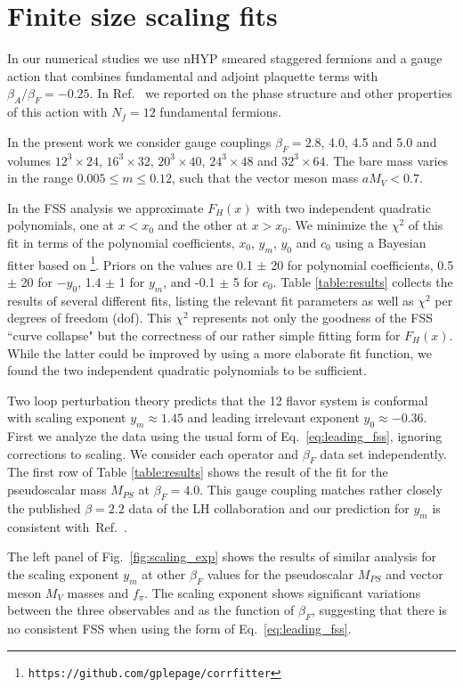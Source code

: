 \documentclass[aps,prl,twocolumn,]{revtex4-1}  %
\newcommand{\X}{\ensuremath{\!\times\!} }
\newcommand{\refcite}[1]{Ref.~\cite{#1}}
\newcommand{\eq}[1]{Eq.~\ref{#1}}
\newcommand{\fig}[1]{Fig.~\ref{#1}}
\begin{document}
\section{Finite size scaling fits}
In our numerical studies we use nHYP smeared staggered fermions and a  gauge action that combines fundamental and adjoint plaquette terms with $\beta_A/\beta_F=-0.25$.
In \refcite{Cheng:2011ic} we reported on the phase structure and other properties of this action with $N_f=12$ fundamental fermions.

In the present work we consider gauge couplings 
$\beta_F=2.8$, 4.0, 4.5 and 5.0  and volumes $12^3\X24$, 
$16^3\X32$, $20^3\X40$, $24^3\X48$ and $32^3\X64$. The bare mass varies in the range $0.005 \leq m \leq 0.12$, such that the vector meson mass $a M_V < 0.7$.


In the FSS analysis we approximate $F_H(x)$ with two independent quadratic polynomials, one at $x<x_0$ and the other at $x > x_0$. We minimize the $\chi^2$ of this fit in terms of the polynomial coefficients, $x_0$, $y_m$, $y_0$ and $c_0$ using a Bayesian fitter based on \cite{Lepage:2001ym,Hornbostel:2011hu}\footnote{\texttt{https://github.com/gplepage/corrfitter}}. Priors on the values are 0.1 $\pm$ 20 for polynomial coefficients, 0.5 $\pm$ 20 for $-y_0$, 1.4 $\pm$ 1 for $y_m$, and -0.1 $\pm$ 5 for $c_0$. Table \ref{table:results} collects the results of several different fits, listing the relevant fit parameters as well as  $\chi^2$ per degrees of freedom (dof). This  $\chi^2$ represents not only the goodness of the FSS ``curve collapse" but the correctness of our rather simple fitting form for $F_H(x)$.
While the latter  could be improved by using a more elaborate fit function, we found the two independent quadratic polynomials to be sufficient.

Two loop perturbation theory predicts that the 12 flavor system is conformal with scaling exponent $y_m \approx 1.45$ and leading irrelevant exponent $y_0 \approx -0.36$. First we analyze the data  using the usual form of \eq{eq:leading_fss}, ignoring corrections to scaling. We consider each operator and $\beta_F$ data set independently.  The first row of  Table \ref{table:results} shows the result of the fit for the pseudoscalar mass $M_{PS}$  at $\beta_F=4.0$. This gauge coupling matches rather closely the published $\beta=2.2$ data of the LH collaboration and our prediction for  $y_m$ is  consistent with~\refcite{Fodor:2011tu}. 

The left panel of \fig{fig:scaling_exp} shows the results of similar analysis for the scaling exponent $y_m$  at other $\beta_F$ values for the pseudoscalar $M_{PS}$ and vector meson $M_V$ masses and $f_\pi$.
The scaling exponent shows significant variations between the three observables and as the function of $\beta_F$, suggesting that there is no consistent FSS when using the form of \eq{eq:leading_fss}.
\end{document}
